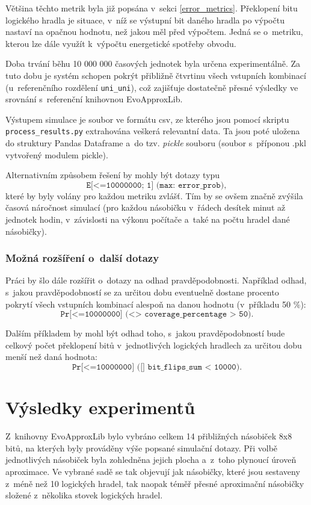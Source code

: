 Většina těchto metrik byla již popsána v~sekci \ref{error_metrics}. Překlopení bitu logického hradla je situace, v~níž se výstupní bit daného hradla po výpočtu nastaví na opačnou hodnotu, než jakou měl před výpočtem. Jedná se o~metriku, kterou lze dále využít k~výpočtu energetické spotřeby obvodu.

Doba trvání běhu 10 000 000 časových jednotek byla určena experimentálně. Za tuto dobu je systém schopen pokrýt přibližně čtvrtinu všech vstupních kombinací (u~referenčního rozdělení \texttt{uni\_uni}), což zajišťuje dostatečně přesné výsledky ve srovnání s~referenční knihovnou EvoApproxLib.

Výstupem simulace je soubor ve formátu csv, ze kterého jsou pomocí skriptu \\\texttt{process\_results.py} extrahována veškerá relevantní data. Ta jsou poté uložena do struktury Pandas Dataframe a~do tzv. \textit{pickle} souboru (soubor s~příponou .pkl vytvořený modulem pickle).

Alternativním způsobem řešení by mohly být dotazy typu
\begin{equation*}
    \texttt{E[<=10000000; 1] (max: error\_prob)},
\end{equation*}
které by byly volány pro každou metriku zvlášť. Tím by se ovšem značně zvýšila časová náročnost simulací (pro každou násobičku v~řádech desítek minut až jednotek hodin, v~závislosti na výkonu počítače a~také na počtu hradel dané násobičky).

\subsection{Možná rozšíření o~další dotazy}
Práci by šlo dále rozšířit o~dotazy na odhad pravděpodobnosti. Například odhad, s~jakou pravděpodobností se za určitou dobu eventuelně dostane procento pokrytí všech vstupních kombinací alespoň na danou hodnotu (v~příkladu 50 \%):
\begin{equation*}
    \texttt{Pr[<=10000000] (<> coverage\_percentage > 50)}.
\end{equation*}

Dalším příkladem by mohl být odhad toho, s~jakou pravděpodobností bude celkový počet překlopení bitů v~jednotlivých logických hradlech za určitou dobu menší než daná hodnota:
\begin{equation*}
    \texttt{Pr[<=10000000] ([] bit\_flips\_sum < 10000)}.
\end{equation*}

\chapter{Výsledky experimentů}
\label{experimenty}
Z~knihovny EvoApproxLib bylo vybráno celkem 14 přibližných násobiček 8x8 bitů, na kterých byly prováděny výše popsané simulační dotazy. Při volbě jednotlivých násobiček byla zohledněna jejich plocha a~z~toho plynoucí úroveň aproximace. Ve vybrané sadě se tak objevují jak násobičky, které jsou sestaveny z~méně než 10 logických hradel, tak naopak téměř přesné aproximační násobičky složené z~několika stovek logických hradel.

